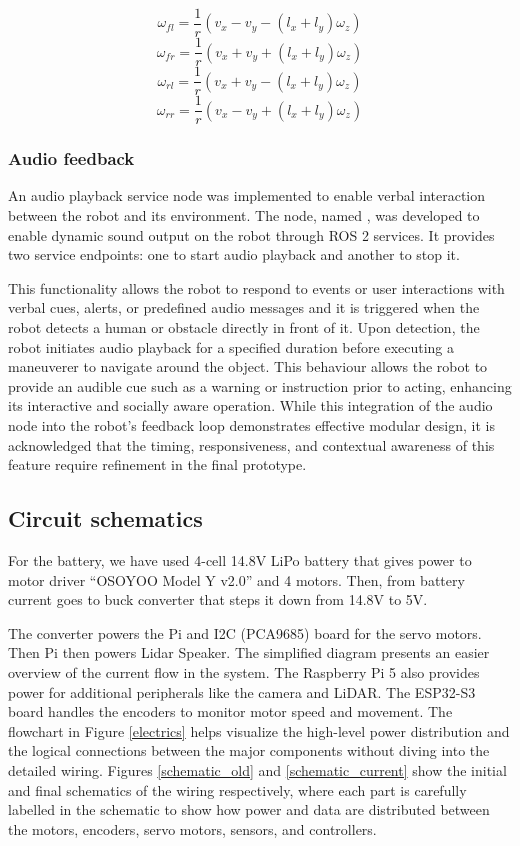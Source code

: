 \documentclass{article}
\begin{document}
$$\omega_{fl}=\frac{1}{r}(v_{x}-v_{y}-(l_{x}+l_{y})\omega_{z})$$
$$\omega_{fr}=\frac{1}{r}(v_{x}+v_{y}+(l_{x}+l_{y})\omega_{z})$$
$$\omega_{rl}=\frac{1}{r}(v_{x}+v_{y}-(l_{x}+l_{y})\omega_{z})$$
$$\omega_{rr}=\frac{1}{r}(v_{x}-v_{y}+(l_{x}+l_{y})\omega_{z})$$

\subsubsection{Audio feedback}

An audio playback service node was implemented to enable verbal interaction between the robot and its environment. The node, named , was developed to enable dynamic sound output on the robot through ROS 2 services. It provides two service endpoints: one to start audio playback and another to stop it. 

This functionality allows the robot to respond to events or user interactions with verbal cues, alerts, or predefined audio messages and it is triggered when the robot detects a human or obstacle directly in front of it. Upon detection, the robot initiates audio playback for a specified duration before executing a maneuverer to navigate around the object. This behaviour allows the robot to provide an audible cue such as a warning or instruction prior to acting, enhancing its interactive and socially aware operation. While this integration of the audio node into the robot's feedback loop demonstrates effective modular design, it is acknowledged that the timing, responsiveness, and contextual awareness of this feature require refinement in the final prototype. 

\subsection{Circuit schematics}

For the battery, we have used 4-cell 14.8V LiPo battery that gives power to motor driver “OSOYOO Model Y v2.0” and 4 motors. Then, from battery current goes to buck converter that steps it down from 14.8V to 5V. 

The converter powers the Pi and I2C (PCA9685) board for the servo motors. Then Pi then powers Lidar Speaker. The simplified diagram presents an easier overview of the current flow in the system. The Raspberry Pi 5 also provides power for additional peripherals like the camera and LiDAR. The ESP32-S3 board handles the encoders to monitor motor speed and movement. The flowchart in Figure \ref{electrics} helps visualize the high-level power distribution and the logical connections between the major components without diving into the detailed wiring. Figures \ref{schematic_old} and \ref{schematic_current} show the initial and final schematics of the wiring respectively, where each part is carefully labelled in the schematic to show how power and data are distributed between the motors, encoders, servo motors, sensors, and controllers.  
\end{document}
